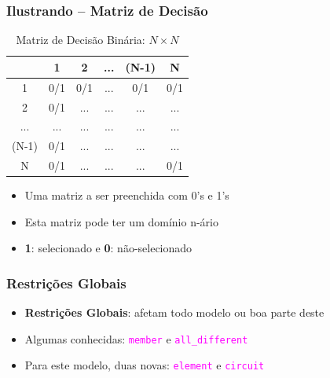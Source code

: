 \begin{frame}[fragile]
\frametitle{Ilustrando -- Matriz de Decisão}


\begin{table}
\centering
\begin{tabular}{|c|c|c|c|c|c|}
\hline 
   & {\color{red} 1}  & {\color{red} 2} & {\color{red}...} &  {\color{red}(N-1)} &  {\color{red} N} \\ \hline
{\color{red}1} & {\color[HTML]{00009B} 0/1} & {\color[HTML]{00009B} 0/1} & ... & {\color[HTML]{00009B} 0/1} & {\color[HTML]{00009B} 0/1} \\ \hline
{\color{red}2} & {\color[HTML]{00009B} 0/1} & ...                        & ...                        & ...  & ...                        \\ \hline
{\color{red}...} & ... & ...                        & ...                        & ... & ...                        \\ \hline
{\color{red}(N-1)} & {\color[HTML]{00009B} 0/1} & ...                        & ...             & ...            & ...                        \\ \hline
{\color{red}N} & {\color[HTML]{00009B} 0/1} & ...                        & ...              & ...           & {\color[HTML]{00009B} 0/1}                        \\ 
\hline 
\end{tabular}

\caption{Matriz de Decisão Binária: $N \times N$}
\end{table}

\begin{itemize}
  \item Uma matriz a ser preenchida com 0's e 1's
  \item Esta matriz pode ter um domínio n-ário 
  \item \textbf{1}: selecionado e \textbf{0}: não-selecionado
\end{itemize}

\end{frame}

\begin{frame}[fragile]
 \frametitle{Restrições Globais}


  \begin{itemize}
  \item   \textbf{Restrições Globais}: afetam todo modelo ou boa parte deste

   \pause
   \item Algumas conhecidas: \textcolor{magenta}{\texttt{member}} e  \textcolor{magenta}{\texttt{all\_different}}
  
  \pause
  \item Para este modelo, duas novas: \textcolor{magenta}{\texttt{element}} e 
  \textcolor{magenta}{\texttt{circuit}}

  \end{itemize}


\end{frame}

